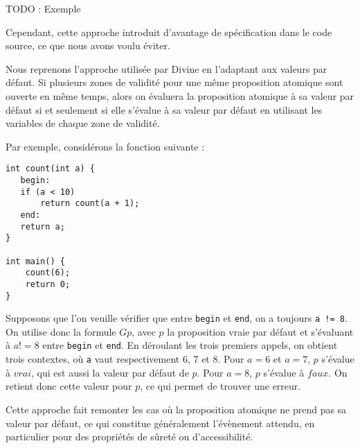 TODO : Exemple

Cependant, cette approche introduit d'avantage de
spécification dans le code source, ce que nous avons voulu éviter.

Nous reprenons l'approche utilisée par Divine \cite{Divine_LTL} en
l'adaptant aux valeurs par défaut. Si plusieurs zones de validité pour
une même proposition atomique sont ouverte en même temps, alors on
évaluera la proposition atomique à sa valeur par défaut si et seulement
si elle s'évalue à sa valeur par défaut en utilisant les variables de
chaque zone de validité.

Par exemple, considérons la fonction suivante :

\begin{lstlisting}
int count(int a) {
   begin:
   if (a < 10)
       return count(a + 1);
   end:
   return a;
}

int main() {
    count(6);
    return 0;
}
\end{lstlisting}

Supposons que l'on veuille vérifier que entre \texttt{begin} et
\texttt{end}, on a toujours \lstinline"a != 8". On utilise donc la
formule \(G p\), avec \(p\) la proposition vraie par défaut et
s'évaluant à \(a != 8\) entre \texttt{begin} et \texttt{end}. En
déroulant les trois premiers appels, on obtient trois contextes, où
\texttt{a} vaut respectivement 6, 7 et 8. Pour \(a = 6\) et
\(a = 7\), \(p\) s'évalue à \(vrai\), qui est aussi la valeur par défaut
de \(p\). Pour \(a = 8\), \(p\) s'évalue à \(faux\). On retient donc
cette valeur pour \(p\), ce qui permet de trouver une erreur.

Cette approche fait remonter les cas où la proposition atomique ne prend
pas sa valeur par défaut, ce qui constitue généralement l'évènement
attendu, en particulier pour des propriétés de sûreté ou
d'accessibilité.
